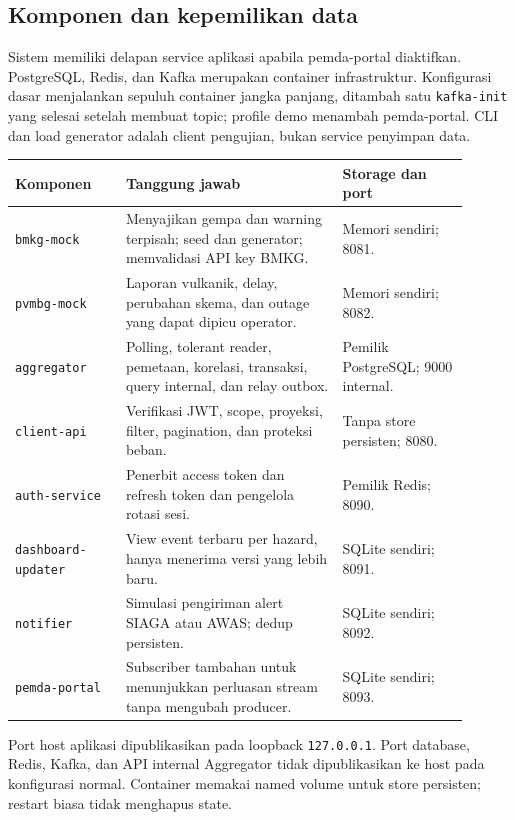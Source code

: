\subsection{Komponen dan kepemilikan data}
Sistem memiliki delapan service aplikasi apabila pemda-portal diaktifkan. PostgreSQL, Redis, dan Kafka merupakan container infrastruktur. Konfigurasi dasar menjalankan sepuluh container jangka panjang, ditambah satu \texttt{kafka-init} yang selesai setelah membuat topic; profile demo menambah pemda-portal. CLI dan load generator adalah client pengujian, bukan service penyimpan data.

\begin{longtable}{P{0.22\linewidth}P{0.43\linewidth}P{0.25\linewidth}}
\toprule Komponen & Tanggung jawab & Storage dan port\\\midrule\endhead
\texttt{bmkg-mock} & Menyajikan gempa dan warning terpisah; seed dan generator; memvalidasi API key BMKG. & Memori sendiri; 8081.\\
\texttt{pvmbg-mock} & Laporan vulkanik, delay, perubahan skema, dan outage yang dapat dipicu operator. & Memori sendiri; 8082.\\
\texttt{aggregator} & Polling, tolerant reader, pemetaan, korelasi, transaksi, query internal, dan relay outbox. & Pemilik PostgreSQL; 9000 internal.\\
\texttt{client-api} & Verifikasi JWT, scope, proyeksi, filter, pagination, dan proteksi beban. & Tanpa store persisten; 8080.\\
\texttt{auth-service} & Penerbit access token dan refresh token dan pengelola rotasi sesi. & Pemilik Redis; 8090.\\
\texttt{dashboard-updater} & View event terbaru per hazard, hanya menerima versi yang lebih baru. & SQLite sendiri; 8091.\\
\texttt{notifier} & Simulasi pengiriman alert SIAGA atau AWAS; dedup persisten. & SQLite sendiri; 8092.\\
\texttt{pemda-portal} & Subscriber tambahan untuk menunjukkan perluasan stream tanpa mengubah producer. & SQLite sendiri; 8093.\\
\bottomrule
\end{longtable}

Port host aplikasi dipublikasikan pada loopback \texttt{127.0.0.1}. Port database, Redis, Kafka, dan API internal Aggregator tidak dipublikasikan ke host pada konfigurasi normal. Container memakai named volume untuk store persisten; restart biasa tidak menghapus state.

